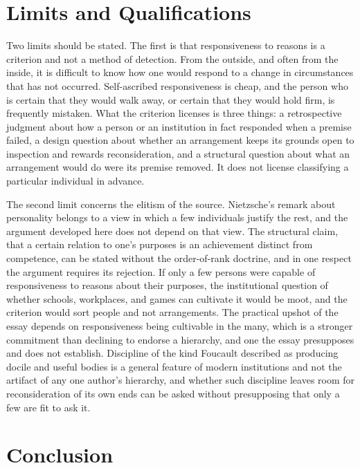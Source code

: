 \documentclass[11pt]{article}
\begin{document}
\section{Limits and Qualifications}

Two limits should be stated. The first is that responsiveness to reasons is a criterion and not a method of detection. From the outside, and often from the inside, it is difficult to know how one would respond to a change in circumstances that has not occurred. Self-ascribed responsiveness is cheap, and the person who is certain that they would walk away, or certain that they would hold firm, is frequently mistaken. What the criterion licenses is three things: a retrospective judgment about how a person or an institution in fact responded when a premise failed, a design question about whether an arrangement keeps its grounds open to inspection and rewards reconsideration, and a structural question about what an arrangement would do were its premise removed. It does not license classifying a particular individual in advance.

The second limit concerns the elitism of the source. Nietzsche's remark about personality belongs to a view in which a few individuals justify the rest, and the argument developed here does not depend on that view. The structural claim, that a certain relation to one's purposes is an achievement distinct from competence, can be stated without the order-of-rank doctrine, and in one respect the argument requires its rejection. If only a few persons were capable of responsiveness to reasons about their purposes, the institutional question of whether schools, workplaces, and games can cultivate it would be moot, and the criterion would sort people and not arrangements. The practical upshot of the essay depends on responsiveness being cultivable in the many, which is a stronger commitment than declining to endorse a hierarchy, and one the essay presupposes and does not establish. Discipline of the kind Foucault described as producing docile and useful bodies \cite{foucault1977} is a general feature of modern institutions and not the artifact of any one author's hierarchy, and whether such discipline leaves room for reconsideration of its own ends can be asked without presupposing that only a few are fit to ask it.
\section{Conclusion}
\end{document}
